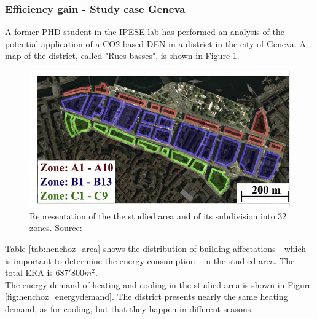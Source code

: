 \documentclass{article}
\begin{document}
\subsubsection{Efficiency gain - Study case Geneva}
A former PHD student in the IPESE lab has performed an analysis of the potential application of a CO2 based DEN in a district in the city of Geneva\cite{henchozPotentialRefrigerantBased}. A map of the district, called "Rues basses", is shown in Figure \ref{fig:henchoz_gva}.

\begin{figure}[h!]
\centering
\includegraphics[width=1\textwidth]{henchoz_gva.JPG}
\caption{Representation of the the studied area and of its subdivision into 32 zones. Source: \cite{henchozPotentialRefrigerantBased}}
\label{fig:henchoz_gva}
\end{figure}

Table \ref{tab:henchoz_area} shows the distribution of building affectations - which is important to determine the energy consumption - in the studied area. The total ERA is $687'800 m^{2}$.\\



The energy demand of heating and cooling in the studied area is shown in Figure \ref{fig:henchoz_energydemand}. The district presents nearly the same heating demand, as for cooling, but that they happen in different seasons. 
\end{document}
